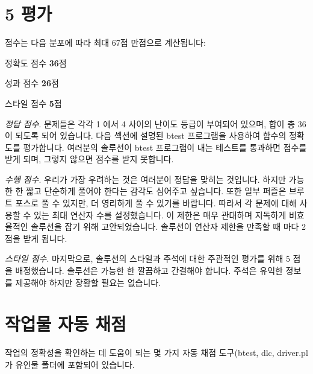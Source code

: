 \documentclass{article}
\begin{document}
\section*{5 평가}
점수는 다음 분포에 따라 최대 67점 만점으로 계산됩니다:

\noindent
정확도 점수 \textbf{36}점

\noindent
성과 점수 \textbf{26}점

\noindent
스타일 점수 \textbf{5}점

\noindent
\textit{정답 점수}. 문제들은 각각 1 에서 4 사이의 난이도 등급이 부여되어 있으며, 합이 총 36 이 되도록 되어 있습니다. 다음 섹션에 설명된 btest 프로그램을 사용하여 함수의 정확도를 평가합니다. 여러분의 솔루션이 btest 프로그램이 내는 테스트를 통과하면 점수를 받게 되며, 그렇지 않으면 점수를 받지 못합니다.

\noindent
\textit{수행 점수}. 우리가 가장 우려하는 것은 여러분이 정답을 맞히는 것입니다. 하지만 가능한 한 짧고 단순하게 풀어야 한다는 감각도 심어주고 싶습니다. 또한 일부 퍼즐은 브루트 포스로 풀 수 있지만, 더 영리하게 풀 수 있기를 바랍니다. 따라서 각 문제에 대해 사용할 수 있는 최대 연산자 수를 설정했습니다. 이 제한은 매우 관대하며 지독하게 비효율적인 솔루션을 잡기 위해 고안되었습니다. 솔루션이 연산자 제한을 만족할 때 마다 2점을 받게 됩니다.

\noindent
\textit{스타일 점수}. 마지막으로, 솔루션의 스타일과 주석에 대한 주관적인 평가를 위해 5 점을 배정했습니다. 솔루션은 가능한 한 깔끔하고 간결해야 합니다. 주석은 유익한 정보를 제공해야 하지만 장황할 필요는 없습니다.

\section*{작업물 자동 채점}
작업의 정확성을 확인하는 데 도움이 되는 몇 가지 자동 채점 도구(btest, dlc, driver.pl가 유인물 폴더에 포함되어 있습니다.
\end{document}
